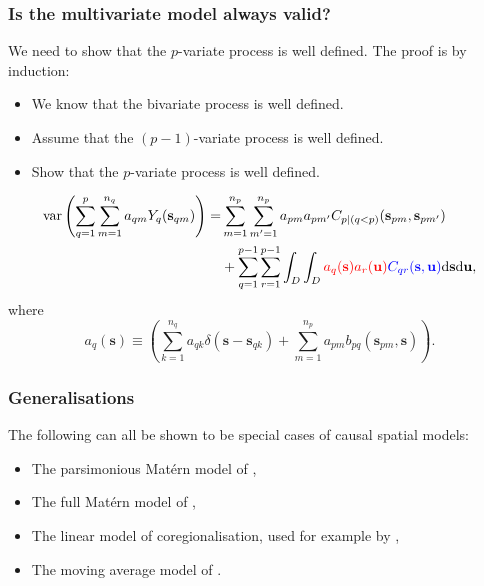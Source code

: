 \documentclass{beamer}
\newcommand{\intd} {\mathrm{d}}
\newcommand{\svec} {\textbf{s}}
\newcommand{\uvec} {\textbf{u}}
\newcommand{\var}{\mathrm{var}}
\newcommand{\red}{\textcolor{red}}%
\newcommand{\blue}{\textcolor{blue}}
\begin{document}
\begin{frame}
\frametitle{Is the multivariate model always valid?}

We need to show that the $p$-variate process is well defined. The proof is by induction:
\begin{itemize}
  \item We know that the bivariate process is well defined.
  \item Assume that the $(p-1)$-variate process is well defined.
  \item Show that the $p$-variate process is well defined.
\end{itemize}

\vspace{-0.3in}
\begin{align*}
\var\left(\sum_{q=1}^p \sum_{m=1}^{n_q} a_{qm}Y_q(\svec_{qm})\right)=& \sum_{m=1}^{n_p}\sum_{m'=1}^{n_p}a_{pm}a_{pm'}C_{p \mid  (q < p)}(\svec_{pm},\svec_{pm'}) \\
&+ \sum_{q=1}^{p-1}\sum_{r=1}^{p-1}\int_D\int_D\red{a_q(\svec)a_r(\uvec)}\blue{C_{qr}(\svec,\uvec)}\intd \svec \intd \uvec,
\end{align*}
where
\begin{equation*}
a_q(\svec) \equiv \left(\sum_{k=1}^{n_q}a_{qk}\delta(\svec - \svec_{qk}) + \sum_{m=1}^{n_p}a_{pm}b_{pq}(\svec_{pm},\svec)\right).
\end{equation*}
\end{frame}


\begin{frame}
\frametitle{Generalisations}

The following can all be shown to be special cases of causal spatial models:

\begin{itemize}
\item The parsimonious Mat{\'e}rn model of \cite{Gneitingetal2010},
\item The full Mat{\'e}rn model of \cite{Gneitingetal2010},
\item The linear model of coregionalisation, used for example by \cite{Wackernagel1995},
\item The moving average model of \cite{verHoef_1998}.
\end{itemize}
\end{frame}

\end{document}
